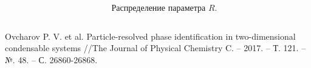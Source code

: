 \documentclass[pdf,hyperref={unicode}]{beamer}
\begin{document}
\begin{frame}
\begin{columns}
\begin{column}{0.47\linewidth}
\end{column}
\begin{column}{0.47\linewidth}
{
\begin{figure}[h]
\caption{ \tiny Распределение параметра $R$.}
\end{figure}
}
\end{column}
\end{columns}
\vspace{3mm}
\tiny{
Ovcharov P. V. et al. Particle-resolved phase identification in two-dimensional condensable systems //The Journal of Physical Chemistry C. – 2017. – Т. 121. – №. 48. – С. 26860-26868.
}
\end{frame}
\end{document}
